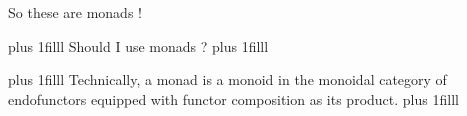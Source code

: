 \begin{frame}
    
\end{frame}

\begin{frame}
    \centering
    \Huge So these are monads !
\end{frame}

\begin{frame}[plain]
    \centering
    \vskip 0pt plus 1filll
    \Huge Should I use monads ?
    \vskip 0pt plus 1filll
\end{frame}

\begin{frame}[plain]
    \centering
    \vskip 0pt plus 1filll
    \Large Technically, a monad is a monoid in the monoidal category of
    endofunctors equipped with functor composition as its product.
    \vskip 0pt plus 1filll
\end{frame}

\begin{frame}[plain]
\end{frame}


